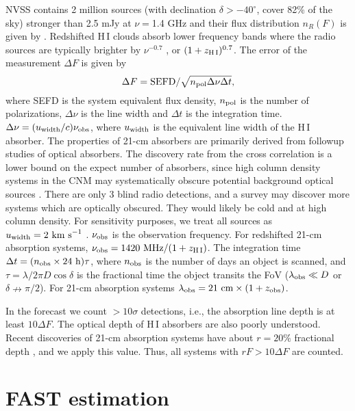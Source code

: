 \documentclass[]{raa}
\newcommand{\HI}{{H{\small\,I}}}
\begin{document}
NVSS contains 2 million sources (with declination $\delta >-40^{\circ}$,
cover 82\% of the sky) stronger than 2.5
mJy at $\nu=$1.4 GHz \citep{1998AJ....115.1693C} and their flux
distribution $n_R(F)$ is given by \cite{1984ApJ...287..461C}.
Redshifted {\HI} clouds absorb lower frequency bands where
the radio sources are typically brighter by $\nu^{-0.7}$
\citep{1998AJ....115.1693C}, or $(1+z_{\rm \HI})^{0.7}$.
The error of the measurement $\Delta F$ is given by
\begin{equation}
    \Delta F={\rm SEFD}/\sqrt{n_{\rm pol}\Delta\nu\Delta t},
\end{equation}
where SEFD is the system equivalent flux density, $n_{\rm pol}$
is the number of polarizations, $\Delta\nu$ is the line width and
$\Delta t$ is the integration time. $\Delta\nu=(u_{\rm width}/c)\nu_{\rm obs}$,
where $u_{\rm width}$ is the equivalent line width of the {\HI}
absorber. The properties of 21-cm absorbers are primarily derived from
followup studies of optical absorbers. The discovery rate from the
cross correlation is a lower bound on the expect number of absorbers,
since high column density systems in the CNM may systematically
obscure potential background optical sources \citep{2014PhRvL.113d1303Y}. There are
only 3 blind radio detections, and a survey may discover more systems
which are optically obscured. They would likely be cold and at high
column density. For sensitivity purposes, we treat all sources as
$u_{\rm width}=2\ {\rm km\ s}^{-1}$
\citep{1982ApJ...259..495W,2005ARA&A..43..861W}.
$\nu_{\rm obs}$ is the observation frequency. For redshifted
21-cm absorption systems, $\nu_{\rm obs}=1420\ {\rm MHz}/(1+z_{\rm \HI})$.
The integration time $\Delta t=(n_{\rm obs}\times 24\ {\rm h})\tau$,
where $n_{\rm obs}$ is the number of days an object is scanned,
and $\tau=\lambda/2\pi D\cos\delta$ is the fractional time the object
transits the FoV ($\lambda_{\rm obs}\ll D$ or $\delta\nrightarrow\pi/2$).
For 21-cm absorption systems $\lambda_{\rm obs}=21\ {\rm cm}\times (1+z_{\rm obs})$.

In the forecast we count $>10\sigma$ detections, i.e., the absorption
line depth is at least $10\Delta F$. The optical depth of {\HI} absorbers
are also poorly understood. Recent discoveries of 21-cm absorption systems
have about $r=20\%$ fractional depth \citep{2015MNRAS.453.1249A,2015MNRAS.453.1268Z},
and we apply this value. Thus, all systems with $rF>10\Delta F$ are counted.




\section{FAST estimation}\label{sec.FAST}
\end{document}
